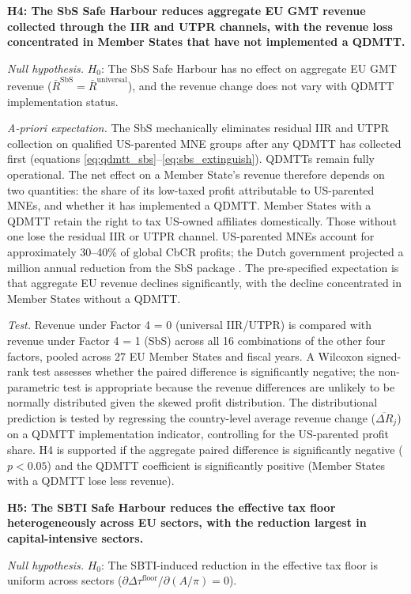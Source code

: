 \documentclass[11pt,a4paper]{article}
\newcommand{\EUR}{\texteuro}
\begin{document}
\textbf{H4: The SbS Safe Harbour reduces aggregate EU GMT revenue collected through the IIR and UTPR channels, with the revenue loss concentrated in Member States that have not implemented a QDMTT.}

\textit{Null hypothesis.} $H_0$: The SbS Safe Harbour has no effect on aggregate EU GMT revenue ($\bar{R}^{\text{SbS}} = \bar{R}^{\text{universal}}$), and the revenue change does not vary with QDMTT implementation status.

\textit{A-priori expectation.} The SbS mechanically eliminates residual IIR and UTPR collection on qualified US-parented MNE groups after any QDMTT has collected first (equations \ref{eq:qdmtt_sbs}--\ref{eq:sbs_extinguish}). QDMTTs remain fully operational. The net effect on a Member State's revenue therefore depends on two quantities: the share of its low-taxed profit attributable to US-parented MNEs, and whether it has implemented a QDMTT. Member States with a QDMTT retain the right to tax US-owned affiliates domestically. Those without one lose the residual IIR or UTPR channel. US-parented MNEs account for approximately 30--40\% of global CbCR profits; the Dutch government projected a \EUR120 million annual reduction from the SbS package \citep{1028}. The pre-specified expectation is that aggregate EU revenue declines significantly, with the decline concentrated in Member States without a QDMTT.

\textit{Test.} Revenue under Factor 4 = 0 (universal IIR/UTPR) is compared with revenue under Factor 4 = 1 (SbS) across all 16 combinations of the other four factors, pooled across 27 EU Member States and fiscal years. A Wilcoxon signed-rank test assesses whether the paired difference is significantly negative; the non-parametric test is appropriate because the revenue differences are unlikely to be normally distributed given the skewed profit distribution. The distributional prediction is tested by regressing the country-level average revenue change ($\overline{\Delta R}_j$) on a QDMTT implementation indicator, controlling for the US-parented profit share. H4 is supported if the aggregate paired difference is significantly negative ($p < 0.05$) and the QDMTT coefficient is significantly positive (Member States with a QDMTT lose less revenue).

\textbf{H5: The SBTI Safe Harbour reduces the effective tax floor heterogeneously across EU sectors, with the reduction largest in capital-intensive sectors.}

\textit{Null hypothesis.} $H_0$: The SBTI-induced reduction in the effective tax floor is uniform across sectors ($\partial \Delta\tau^{\text{floor}} / \partial (A/\pi) = 0$).
\end{document}
